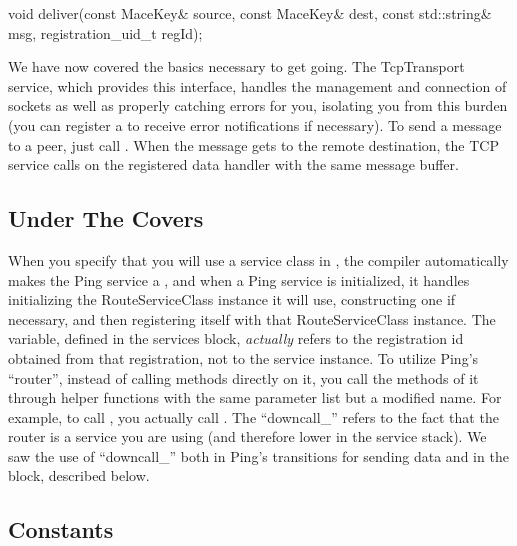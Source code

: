 \begin{programlisting}
void deliver(const MaceKey& source, const MaceKey& dest, const std::string& msg, 
             registration_uid_t regId);
\end{programlisting}

We have now covered the basics necessary to get going.  The TcpTransport
service, which provides this interface, handles the management and
connection of sockets as well as properly catching errors for you,
isolating you from this burden (you can register a
 to receive error notifications if
necessary).  To send a message to a peer, just call .
When the message gets to the remote destination, the TCP service calls
 on the registered data handler with the same
message buffer.


\subsection{Under The Covers}
\label{sec:route-working-details}

When you specify that you will use a  service class
in , the compiler automatically makes the Ping
service a , and when a Ping service is
initialized, it handles initializing the RouteServiceClass instance it
will use, constructing one if necessary, and then registering itself
with that RouteServiceClass instance.  The 
variable, defined in the services block, \emph{actually} refers to the
registration id obtained from that registration, not to the service
instance.  To utilize Ping's ``router'', instead of calling methods
directly on it, you call the methods of it through helper functions
with the same parameter list but a modified name.  For example, to
call , you actually call .
The ``downcall\_'' refers to the fact that the router is a service you
are using (and therefore lower in the service stack).  We saw the use of
``downcall\_'' both in Ping's transitions for sending data and in the
 block, described below.


\subsection{Constants}
\label{sec:constants}

